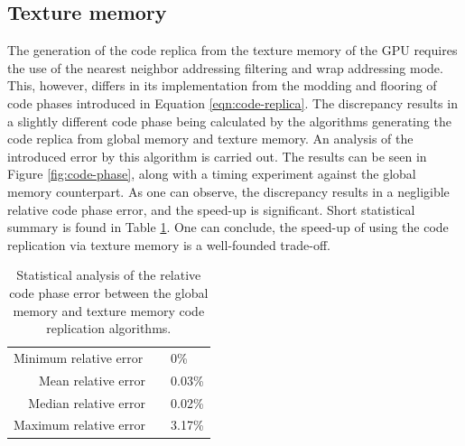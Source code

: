 \documentclass{juliacon}
\begin{document}
\subsection*{Texture memory}

The generation of the code replica from the texture memory of the GPU requires the use of the nearest neighbor addressing filtering and wrap addressing mode. This, however, differs in its implementation from the modding and flooring of code phases introduced in Equation \ref{eqn:code-replica}. The discrepancy results in a slightly different code phase being calculated by the algorithms generating the code replica from global memory and texture memory. An analysis of the introduced error by this algorithm is carried out. The results can be seen in Figure \ref{fig:code-phase}, along with a timing experiment against the global memory counterpart. As one can observe, the discrepancy results in a negligible relative code phase error, and the speed-up is significant. Short statistical summary is found in Table \ref{tab:code-phase-error}. One can conclude, the speed-up of using the code replication via texture memory is a well-founded trade-off. 

\begin{table}
  \centering
  \caption{\label{tab:code-phase-error} Statistical analysis of the relative code phase error between the global memory and texture memory code replication algorithms.}
  \begin{tabular}{rcl}
  \multicolumn{1}{l}{Minimum relative error} & \multicolumn{1}{l}{} & 0\%                       \\
  Mean relative error                        &                      & 0.03\%  \\
  Median relative error                      &                      & 0.02\%  \\
  Maximum relative error                     &                      & 3.17\% 
  \end{tabular}
\end{table}
\end{document}
